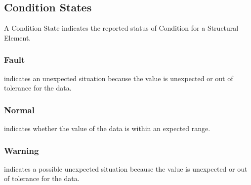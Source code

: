 \subsection{Condition States} \label{sec:Condition States}


A \gls{Condition State} indicates the reported status of \gls{Condition} for a \gls{Structural Element}.


\subsubsection{Fault}
\label{sec:Fault}



 indicates an unexpected situation because the value is unexpected or out of tolerance for the data.



\subsubsection{Normal}
\label{sec:Normal}



 indicates whether the value of the data is within an expected range.



\subsubsection{Warning}
\label{sec:Warning}



 indicates a possible unexpected situation because the value is unexpected or out of tolerance for the data.


